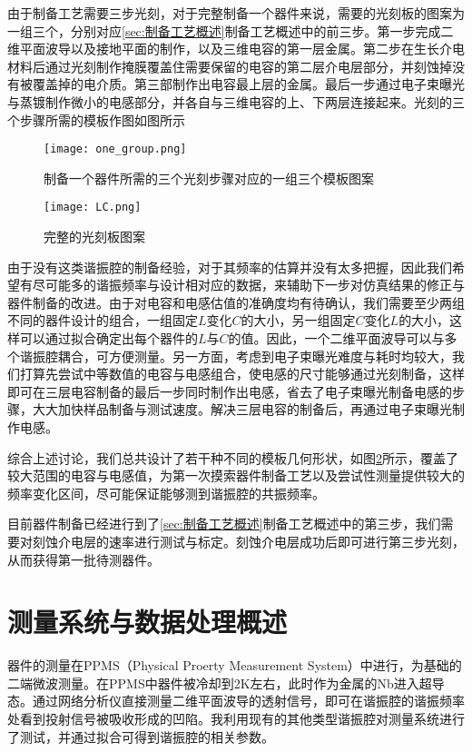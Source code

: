             由于制备工艺需要三步光刻，对于完整制备一个器件来说，需要的光刻板的图案为一组三个，分别对应\ref{sec:制备工艺概述}制备工艺概述中的前三步。第一步完成二维平面波导以及接地平面的制作，以及三维电容的第一层金属。第二步在生长介电材料后通过光刻制作掩膜覆盖住需要保留的电容的第二层介电层部分，并刻蚀掉没有被覆盖掉的电介质。第三部制作出电容最上层的金属。最后一步通过电子束曝光与蒸镀制作微小的电感部分，并各自与三维电容的上、下两层连接起来。光刻的三个步骤所需的模板作图如图所示
            

            \begin{figure}
                \texttt{[image: one\_group.png]}
                \caption{制备一个器件所需的三个光刻步骤对应的一组三个模板图案}
                \label{fig:one_group}
            \end{figure}

            \begin{figure}
                \texttt{[image: LC.png]}
                \caption{完整的光刻板图案}
                \label{fig:LC}
            \end{figure}

            由于没有这类谐振腔的制备经验，对于其频率的估算并没有太多把握，因此我们希望有尽可能多的谐振频率与设计相对应的数据，来辅助下一步对仿真结果的修正与器件制备的改进。由于对电容和电感估值的准确度均有待确认，我们需要至少两组不同的器件设计的组合，一组固定$L$变化$C$的大小，另一组固定$C$变化$L$的大小，这样可以通过拟合确定出每个器件的$L$与$C$的值。因此，一个二维平面波导可以与多个谐振腔耦合，可方便测量。另一方面，考虑到电子束曝光难度与耗时均较大，我们打算先尝试中等数值的电容与电感组合，使电感的尺寸能够通过光刻制备，这样即可在三层电容制备的最后一步同时制作出电感，省去了电子束曝光制备电感的步骤，大大加快样品制备与测试速度。解决三层电容的制备后，再通过电子束曝光制作电感。

            综合上述讨论，我们总共设计了若干种不同的模板几何形状，如图\ref{fig:LC}所示，覆盖了较大范围的电容与电感值，为第一次摸索器件制备工艺以及尝试性测量提供较大的频率变化区间，尽可能保证能够测到谐振腔的共振频率。

            目前器件制备已经进行到了\ref{sec:制备工艺概述}制备工艺概述中的第三步，我们需要对刻蚀介电层的速率进行测试与标定。刻蚀介电层成功后即可进行第三步光刻，从而获得第一批待测器件。
            



        \section{测量系统与数据处理概述} %
        \label{sec:测量系统与数据处理概述}
            器件的测量在PPMS（Physical Proerty Measurement System）中进行，为基础的二端微波测量。在PPMS中器件被冷却到2K左右，此时作为金属的Nb进入超导态。通过网络分析仪直接测量二维平面波导的透射信号，即可在谐振腔的谐振频率处看到投射信号被吸收形成的凹陷。我利用现有的其他类型谐振腔对测量系统进行了测试，并通过拟合可得到谐振腔的相关参数\cite{Khalil2012}。






